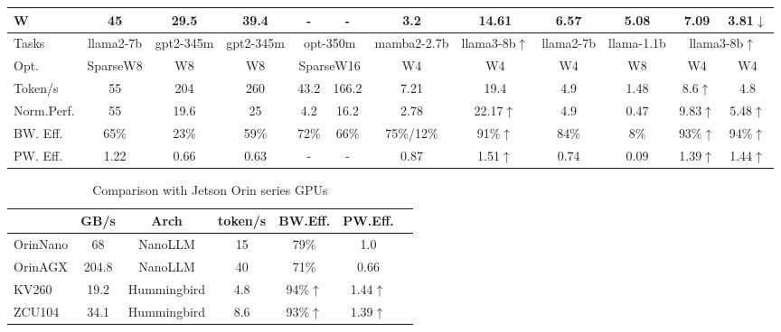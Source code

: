 \documentclass[conference]{IEEEtran}
\begin{document}
\begin{table}[t]
\begin{tabular}{lccccccccccc}
  {W}           & 45        & 29.5       & 39.4      & -      & -                   & 3.2        & 14.61       & 6.57     & 5.08      & 7.09       & 3.81$\downarrow$              \\
  \midrule
  {Tasks}       & llama2-7b & gpt2-345m  & gpt2-345m & \multicolumn{2}{c}{opt-350m} & mamba2-2.7b& llama3-8b$\uparrow $   & llama2-7b& llama-1.1b& \multicolumn{2}{c}{llama3-8b$\uparrow $}  \\
  {Opt.}        & SparseW8  & W8         & W8        & \multicolumn{2}{c}{SparseW16}& W4         & W4          & W4       & W8        & W4         & W4                \\
  {Token/s}     & 55        & 204        & 260       & 43.2   & 166.2               & 7.21       & 19.4        & 4.9      & 1.48      & 8.6$\uparrow $        & 4.8               \\
  {Norm.Perf.}  & 55        & 19.6       & 25        & 4.2    & 16.2                & 2.78       & 22.17$\uparrow $       & 4.9      & 0.47      & 9.83$\uparrow $       & 5.48$\uparrow $              \\
  {BW. Eff.}    & 65\%      & 23\%       & 59\%      & 72\%   & 66\%                & 75\%/12\%  & 91\%$\uparrow $        & 84\%     & 8\%       & 93\%$\uparrow $       & 94\%$\uparrow $                  \\
  {PW. Eff.}    & 1.22      & 0.66       & 0.63      & -      & -                   & 0.87       & 1.51$\uparrow $        & 0.74     & 0.09      & 1.39$\uparrow $       & 1.44$\uparrow $              \\
  \bottomrule
  \end{tabular}
  \label{tab:fpga_comparison}
\end{table}

\begin{table}
  \centering
  \caption{Comparison with Jetson Orin series GPUs}
  \begin{tabular}{lcccccc}
  \toprule
    & \textbf{GB/s} & \textbf{Arch} & \textbf{token/s} & \textbf{BW.Eff.} & \textbf{PW.Eff.} \\
  \midrule
  OrinNano   & 68    &  NanoLLM      &  15\cite{jetsonbenchmark} & 79\% & 1.0 \\
  OrinAGX    & 204.8 &  NanoLLM      &  40\cite{jetsonbenchmark} & 71\% & 0.66\\
  KV260            & 19.2  &  Hummingbird  &  4.8  & 94\%$\uparrow $   & 1.44$\uparrow $  \\
  ZCU104           & 34.1  &  Hummingbird  &  8.6  & 93\%$\uparrow $   & 1.39$\uparrow $  \\
  \bottomrule
  \end{tabular}
  \label{tab:gpucompare}
  \end{table}
\end{document}
